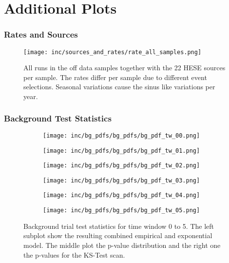 \section{Additional Plots}

\subsubsection{Rates and Sources}
\begin{figure}[htbp]
  \centering
  \texttt{[image: inc/sources\_and\_rates/rate\_all\_samples.png]}
  \caption{All runs in the off data samples together with the 22 HESE sources per sample. The rates differ per sample due to different event selections. Seasonal variations cause the sinus like variations per year.}
  \label{fig:rate_all_samples}
\end{figure}

\subsubsection{Background Test Statistics}
\begin{figure}[htbp]
  \centering
  \begin{subfigure}[c]{\textwidth}
    \texttt{[image: inc/bg\_pdfs/bg\_pdfs/bg\_pdf\_tw\_00.png]}
  \end{subfigure}
  \begin{subfigure}[c]{\textwidth}
    \texttt{[image: inc/bg\_pdfs/bg\_pdfs/bg\_pdf\_tw\_01.png]}
  \end{subfigure}
  \begin{subfigure}[c]{\textwidth}
    \texttt{[image: inc/bg\_pdfs/bg\_pdfs/bg\_pdf\_tw\_02.png]}
  \end{subfigure}
  \begin{subfigure}[c]{\textwidth}
    \texttt{[image: inc/bg\_pdfs/bg\_pdfs/bg\_pdf\_tw\_03.png]}
  \end{subfigure}
  \begin{subfigure}[c]{\textwidth}
    \texttt{[image: inc/bg\_pdfs/bg\_pdfs/bg\_pdf\_tw\_04.png]}
  \end{subfigure}
  \begin{subfigure}[c]{\textwidth}
    \texttt{[image: inc/bg\_pdfs/bg\_pdfs/bg\_pdf\_tw\_05.png]}
  \end{subfigure}
  \caption{Background trial test statistics for time window 0 to 5. The left subplot show the resulting combined empirical and exponential model. The middle plot the p-value distribution and the right one the p-values for the KS-Test scan.}
\end{figure}


